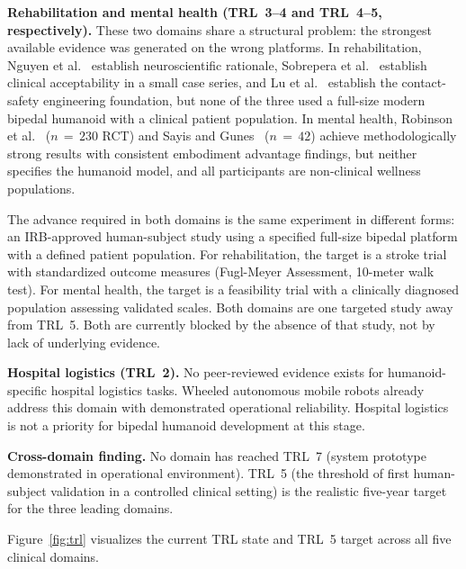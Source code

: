 \textbf{Rehabilitation and mental health (TRL~3--4 and TRL~4--5, respectively).}
These two domains share a structural problem: the strongest available evidence
was generated on the wrong platforms. In rehabilitation, Nguyen et
al.~\cite{nguyen2024eeg} establish neuroscientific rationale, Sobrepera et
al.~\cite{sobrepera2022feasibility} establish clinical acceptability in a small
case series, and Lu et al.~\cite{lu2025gentlehumanoid} establish the
contact-safety engineering foundation, but none of the three used a full-size
modern bipedal humanoid with a clinical patient population. In mental health,
Robinson et al.~\cite{robinson2023brief} ($n\,=\,230$ RCT) and Sayis and
Gunes~\cite{sayis2024technology} ($n\,=\,42$) achieve methodologically strong
results with consistent embodiment advantage findings, but neither specifies the
humanoid model, and all participants are non-clinical wellness populations.

The advance required in both domains is the same experiment in different forms:
an IRB-approved human-subject study using a specified full-size bipedal platform
with a defined patient population. For rehabilitation, the target is a stroke
trial with standardized outcome measures (Fugl-Meyer Assessment,
10-meter walk test). For mental health, the target is a feasibility trial with a
clinically diagnosed population assessing validated scales. Both domains are one
targeted study away from TRL~5. Both are currently blocked by the absence of
that study, not by lack of underlying evidence.

\textbf{Hospital logistics (TRL~2).} No peer-reviewed evidence exists for
humanoid-specific hospital logistics tasks. Wheeled autonomous mobile robots
already address this domain with demonstrated operational reliability. Hospital
logistics is not a priority for bipedal humanoid development at this stage.

\textbf{Cross-domain finding.} No domain has reached TRL~7 (system prototype
demonstrated in operational environment). TRL~5 (the threshold of first
human-subject validation in a controlled clinical setting) is the realistic
five-year target for the three leading domains.

Figure~\ref{fig:trl} visualizes the current TRL state and TRL~5 target across
all five clinical domains.

